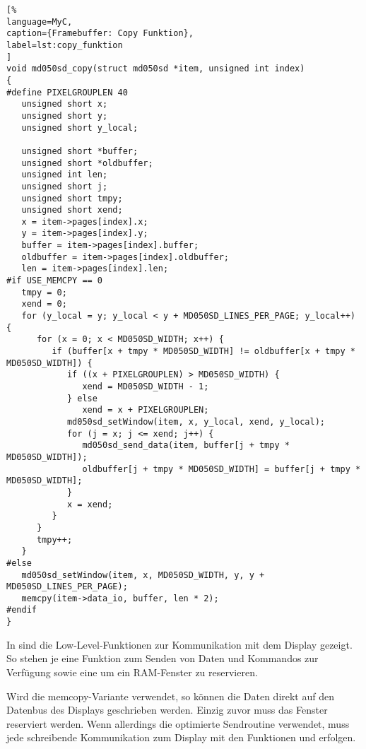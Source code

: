\begin{lstlisting}[%
language=MyC,
caption={Framebuffer: Copy Funktion},
label=lst:copy_funktion
]
void md050sd_copy(struct md050sd *item, unsigned int index)
{
#define PIXELGROUPLEN 40
   unsigned short x;
   unsigned short y;
   unsigned short y_local;

   unsigned short *buffer;
   unsigned short *oldbuffer;
   unsigned int len;
   unsigned short j;
   unsigned short tmpy;
   unsigned short xend;
   x = item->pages[index].x;
   y = item->pages[index].y;
   buffer = item->pages[index].buffer;
   oldbuffer = item->pages[index].oldbuffer;
   len = item->pages[index].len;
#if USE_MEMCPY == 0
   tmpy = 0;
   xend = 0;
   for (y_local = y; y_local < y + MD050SD_LINES_PER_PAGE; y_local++) {
      for (x = 0; x < MD050SD_WIDTH; x++) {
         if (buffer[x + tmpy * MD050SD_WIDTH] != oldbuffer[x + tmpy * MD050SD_WIDTH]) {
            if ((x + PIXELGROUPLEN) > MD050SD_WIDTH) {
               xend = MD050SD_WIDTH - 1;
            } else
               xend = x + PIXELGROUPLEN;
            md050sd_setWindow(item, x, y_local, xend, y_local);
            for (j = x; j <= xend; j++) {
               md050sd_send_data(item, buffer[j + tmpy * MD050SD_WIDTH]);
               oldbuffer[j + tmpy * MD050SD_WIDTH] = buffer[j + tmpy * MD050SD_WIDTH];
            }
            x = xend;
         }
      }
      tmpy++;
   }
#else
   md050sd_setWindow(item, x, MD050SD_WIDTH, y, y + MD050SD_LINES_PER_PAGE);
   memcpy(item->data_io, buffer, len * 2);
#endif
}
\end{lstlisting}
In  sind die Low-Level-Funktionen zur Kommunikation mit dem Display gezeigt. So stehen je eine Funktion zum Senden von Daten und Kommandos zur Verfügung sowie eine um ein RAM-Fenster zu reservieren. 

Wird die memcopy-Variante verwendet, so können die Daten direkt auf den Datenbus des Displays geschrieben werden. Einzig zuvor muss das Fenster reserviert werden. Wenn allerdings die optimierte Sendroutine verwendet, muss jede schreibende Kommunikation zum Display mit den Funktionen  und  erfolgen. 

